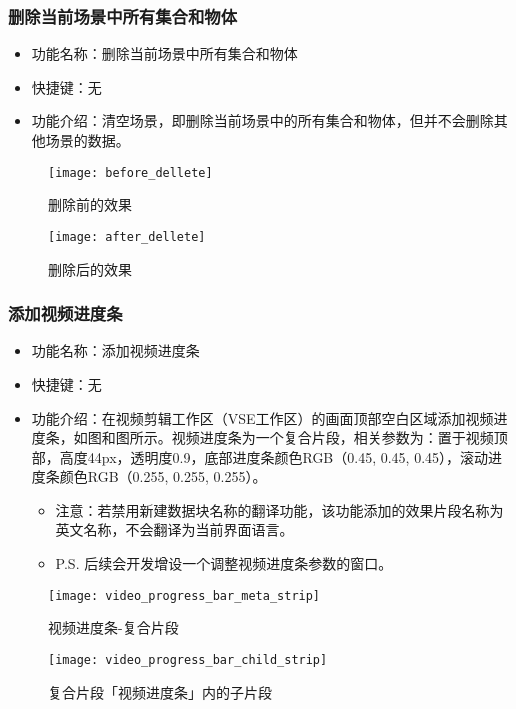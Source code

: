 \documentclass{../../public_resources/doc}
\begin{document}
\subsubsection{删除当前场景中所有集合和物体}
\begin{itemize}
    \item 功能名称：删除当前场景中所有集合和物体
    \item 快捷键：无
    \item 功能介绍：清空场景，即删除当前场景中的所有集合和物体，但并不会删除其他场景的数据。
\end{itemize}

\begin{figure}[h!]
    \begin{minipage}[t]{0.48\linewidth}
        \texttt{[image: before\_dellete]}
        \caption{删除前的效果}
    \end{minipage}
    \quad
    \begin{minipage}[t]{0.48\linewidth}
        \texttt{[image: after\_dellete]}
        \caption{删除后的效果}
    \end{minipage}
\end{figure}

\subsubsection{添加视频进度条}
\begin{itemize}
    \item 功能名称：添加视频进度条
    \item 快捷键：无
    \item 功能介绍：在视频剪辑工作区（VSE工作区）的画面顶部空白区域添加视频进度条，如图和图所示。视频进度条为一个复合片段，相关参数为：置于视频顶部，高度44px，透明度0.9，底部进度条颜色RGB（0.45, 0.45, 0.45），滚动进度条颜色RGB（0.255, 0.255, 0.255）。
    \begin{itemize}
        \item 注意：若禁用新建数据块名称的翻译功能，该功能添加的效果片段名称为英文名称，不会翻译为当前界面语言。
        \item P.S. 后续会开发增设一个调整视频进度条参数的窗口。
    \end{itemize}
\end{itemize}

\begin{figure}[h!]
    \begin{minipage}[t]{0.48\linewidth}
        \texttt{[image: video\_progress\_bar\_meta\_strip]}
        \caption{视频进度条-复合片段}
        \label{视频进度条-复合片段}
    \end{minipage}
    \quad
    \begin{minipage}[t]{0.48\linewidth}
        \texttt{[image: video\_progress\_bar\_child\_strip]}
        \caption{复合片段「视频进度条」内的子片段}
        \label{复合片段「视频进度条」内的子片段}
    \end{minipage}
\end{figure}
\end{document}
